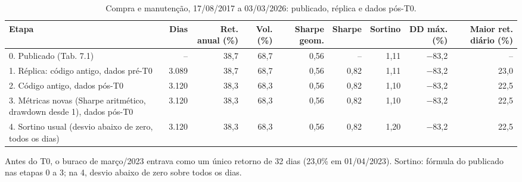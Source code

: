 \begin{table}[H]
\centering
\small
\caption{Compra e manutenção, 17/08/2017 a 03/03/2026: publicado, réplica e dados pós-T0.}
\label{tab:A1-compra-manutencao}
\begin{tabular}{lrrrrrrrr}
\toprule
Etapa & Dias & Ret. anual (\%) & Vol. (\%) & Sharpe geom. & Sharpe & Sortino & DD máx. (\%) & Maior ret. diário (\%) \\
\midrule
0. Publicado (Tab. 7.1) & -- & 38{,}7 & 68{,}7 & 0{,}56 & -- & 1{,}11 & $-$83{,}2 & -- \\
1. Réplica: código antigo, dados pré-T0 & 3.089 & 38{,}7 & 68{,}7 & 0{,}56 & 0{,}82 & 1{,}11 & $-$83{,}2 & 23{,}0 \\
2. Código antigo, dados pós-T0 & 3.120 & 38{,}3 & 68{,}3 & 0{,}56 & 0{,}82 & 1{,}10 & $-$83{,}2 & 22{,}5 \\
3. Métricas novas (Sharpe aritmético, drawdown desde 1), dados pós-T0 & 3.120 & 38{,}3 & 68{,}3 & 0{,}56 & 0{,}82 & 1{,}10 & $-$83{,}2 & 22{,}5 \\
4. Sortino usual (desvio abaixo de zero, todos os dias) & 3.120 & 38{,}3 & 68{,}3 & 0{,}56 & 0{,}82 & 1{,}20 & $-$83{,}2 & 22{,}5 \\
\bottomrule
\end{tabular}

\par\smallskip\parbox{\linewidth}{\footnotesize Antes do T0, o buraco de março/2023 entrava como um único retorno de 32 dias (23{,}0\% em 01/04/2023). Sortino: fórmula do publicado nas etapas 0 a 3; na 4, desvio abaixo de zero sobre todos os dias.}
\end{table}
